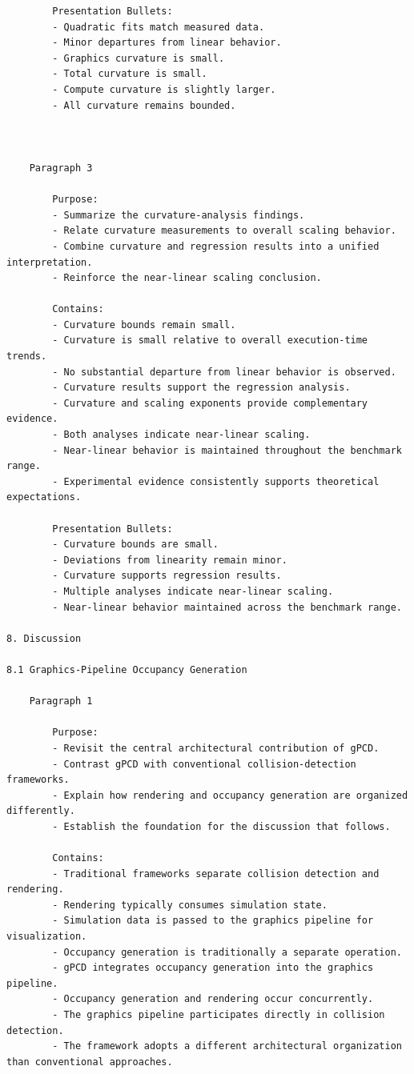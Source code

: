\begin{verbatim}
		Presentation Bullets:
		- Quadratic fits match measured data.
		- Minor departures from linear behavior.
		- Graphics curvature is small.
		- Total curvature is small.
		- Compute curvature is slightly larger.
		- All curvature remains bounded.		
		


	Paragraph 3

		Purpose:
		- Summarize the curvature-analysis findings.
		- Relate curvature measurements to overall scaling behavior.
		- Combine curvature and regression results into a unified interpretation.
		- Reinforce the near-linear scaling conclusion.

		Contains:
		- Curvature bounds remain small.
		- Curvature is small relative to overall execution-time trends.
		- No substantial departure from linear behavior is observed.
		- Curvature results support the regression analysis.
		- Curvature and scaling exponents provide complementary evidence.
		- Both analyses indicate near-linear scaling.
		- Near-linear behavior is maintained throughout the benchmark range.
		- Experimental evidence consistently supports theoretical expectations.

		Presentation Bullets:
		- Curvature bounds are small.
		- Deviations from linearity remain minor.
		- Curvature supports regression results.
		- Multiple analyses indicate near-linear scaling.
		- Near-linear behavior maintained across the benchmark range.		

8. Discussion

8.1 Graphics-Pipeline Occupancy Generation

	Paragraph 1

		Purpose:
		- Revisit the central architectural contribution of gPCD.
		- Contrast gPCD with conventional collision-detection frameworks.
		- Explain how rendering and occupancy generation are organized differently.
		- Establish the foundation for the discussion that follows.

		Contains:
		- Traditional frameworks separate collision detection and rendering.
		- Rendering typically consumes simulation state.
		- Simulation data is passed to the graphics pipeline for visualization.
		- Occupancy generation is traditionally a separate operation.
		- gPCD integrates occupancy generation into the graphics pipeline.
		- Occupancy generation and rendering occur concurrently.
		- The graphics pipeline participates directly in collision detection.
		- The framework adopts a different architectural organization than conventional approaches.


\end{verbatim}
